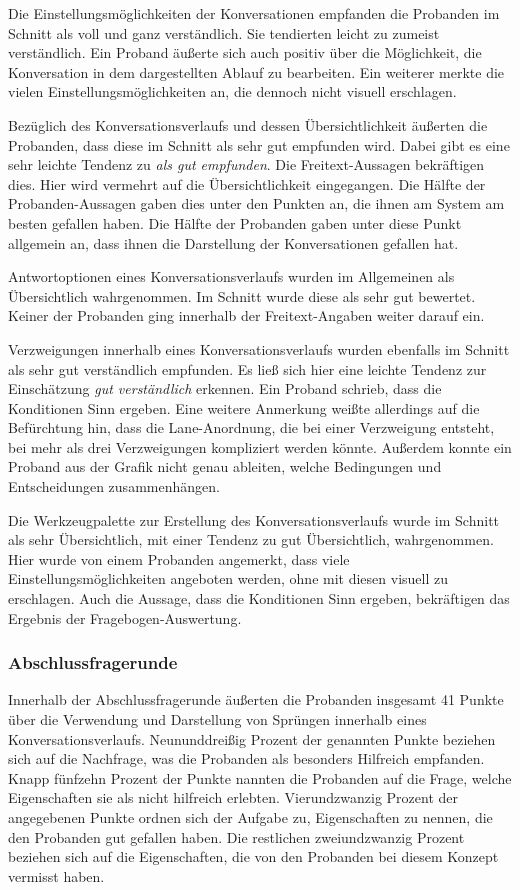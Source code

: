 Die Einstellungsmöglichkeiten der Konversationen empfanden die Probanden im Schnitt als voll und ganz verständlich. Sie tendierten leicht zu zumeist verständlich. Ein Proband äußerte sich auch positiv über die Möglichkeit, die Konversation in dem dargestellten Ablauf zu bearbeiten. Ein weiterer merkte die vielen Einstellungsmöglichkeiten an, die dennoch nicht visuell erschlagen.

Bezüglich des Konversationsverlaufs und dessen Übersichtlichkeit äußerten die Probanden, dass diese im Schnitt als sehr gut empfunden wird. Dabei gibt es eine sehr leichte Tendenz zu \emph{als gut empfunden}. Die Freitext-Aussagen bekräftigen dies. Hier wird vermehrt auf die Übersichtlichkeit eingegangen. Die Hälfte der Probanden-Aussagen gaben dies unter den Punkten an, die ihnen am System am besten gefallen haben. Die Hälfte der Probanden gaben unter diese Punkt allgemein an, dass ihnen die Darstellung der Konversationen gefallen hat.

Antwortoptionen eines Konversationsverlaufs wurden im Allgemeinen als Übersichtlich wahrgenommen. Im Schnitt wurde diese als sehr gut bewertet. Keiner der Probanden ging innerhalb der Freitext-Angaben weiter darauf ein.

Verzweigungen innerhalb eines Konversationsverlaufs wurden ebenfalls im Schnitt als sehr gut verständlich empfunden. Es ließ sich hier eine leichte Tendenz zur Einschätzung \emph{gut verständlich} erkennen. Ein Proband schrieb, dass die Konditionen Sinn ergeben. Eine weitere Anmerkung weißte allerdings auf die Befürchtung hin, dass die Lane-Anordnung, die bei einer Verzweigung entsteht, bei mehr als drei Verzweigungen kompliziert werden könnte. Außerdem konnte ein Proband aus der Grafik nicht genau ableiten, welche Bedingungen und Entscheidungen zusammenhängen. 

Die Werkzeugpalette zur Erstellung des Konversationsverlaufs wurde im Schnitt als sehr Übersichtlich, mit einer Tendenz zu gut Übersichtlich, wahrgenommen. Hier wurde von einem Probanden angemerkt, dass viele Einstellungsmöglichkeiten angeboten werden, ohne mit diesen visuell zu erschlagen. Auch die Aussage, dass die Konditionen Sinn ergeben, bekräftigen das Ergebnis der Fragebogen-Auswertung. 

\subsubsection{Abschlussfragerunde}
Innerhalb der Abschlussfragerunde äußerten die Probanden insgesamt 41 Punkte über die Verwendung und Darstellung von Sprüngen innerhalb eines Konversationsverlaufs. Neununddreißig Prozent der genannten Punkte beziehen sich auf die Nachfrage, was die Probanden als besonders Hilfreich empfanden. Knapp fünfzehn Prozent der Punkte nannten die Probanden auf die Frage, welche Eigenschaften sie als nicht hilfreich erlebten. Vierundzwanzig Prozent der angegebenen Punkte ordnen sich der Aufgabe zu, Eigenschaften zu nennen, die den Probanden gut gefallen haben. Die restlichen zweiundzwanzig Prozent beziehen sich auf die Eigenschaften, die von den Probanden bei diesem Konzept vermisst haben.  

